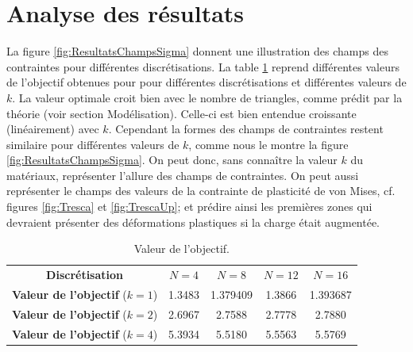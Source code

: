\section{Analyse des résultats}
La figure \ref{fig:ResultatsChampsSigma} donnent une illustration des champs des contraintes pour différentes discrétisations. La table \ref{table:objectif} reprend différentes valeurs de l'objectif obtenues pour pour différentes discrétisations et différentes valeurs de $k$. La valeur optimale croit bien avec le nombre de triangles, comme prédit par la théorie (voir section Modélisation). Celle-ci est bien entendue croissante (linéairement) avec $k$. Cependant la formes des champs de contraintes restent similaire pour différentes valeurs de $k$, comme nous le montre la figure \ref{fig:ResultatsChampsSigma}. On peut donc, sans connaître la valeur $k$ du matériaux, représenter l'allure des champs de contraintes. On peut aussi représenter le champs des valeurs de la contrainte de plasticité de von Mises, cf. figures \ref{fig:Tresca} et \ref{fig:TrescaUp}; et prédire ainsi les premières zones qui devraient présenter des déformations plastiques si la charge était augmentée.

\begin{table}[h!]
\centering
\begin{tabular}{c|cccc}
\textbf{Discrétisation} & $N=4$ & $N=8$ & $N=12$ & $N=16$\\
\textbf{Valeur de l'objectif} ($k=1$) & 1.3483 & 1.379409 & 1.3866 & 1.393687 \\
\textbf{Valeur de l'objectif} ($k=2$) & 2.6967 & 2.7588 & 2.7778 & 2.7880\\
\textbf{Valeur de l'objectif} ($k=4$) & 5.3934 & 5.5180 & 5.5563 & 5.5769
\end{tabular}
\caption{Valeur de l'objectif.}
\label{table:objectif}
\end{table} 

